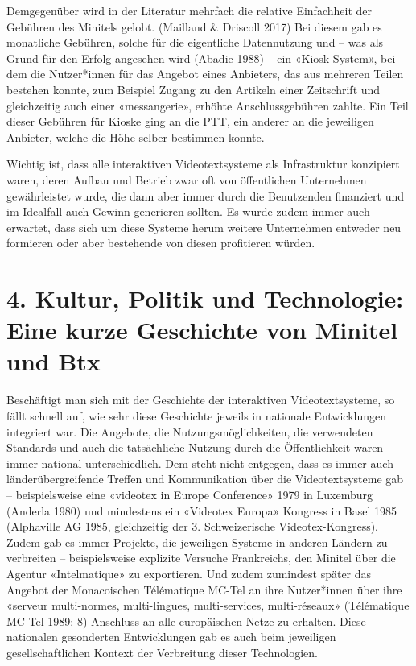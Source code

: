 \documentclass[a4paper,
fontsize=11pt,
oneside,
numbers=noperiodatend,
parskip=half-,
bibliography=totoc,
final
]{scrartcl}
\begin{document}
Demgegenüber wird in der Literatur mehrfach die relative Einfachheit der
Gebühren des Minitels gelobt. (Mailland \& Driscoll 2017) Bei diesem gab
es monatliche Gebühren, solche für die eigentliche Datennutzung und --
was als Grund für den Erfolg angesehen wird (Abadie 1988) -- ein
«Kiosk-System», bei dem die Nutzer*innen für das Angebot eines
Anbieters, das aus mehreren Teilen bestehen konnte, zum Beispiel Zugang
zu den Artikeln einer Zeitschrift und gleichzeitig auch einer
«messangerie», erhöhte Anschlussgebühren zahlte. Ein Teil dieser
Gebühren für Kioske ging an die PTT, ein anderer an die jeweiligen
Anbieter, welche die Höhe selber bestimmen konnte.

Wichtig ist, dass alle interaktiven Videotextsysteme als Infrastruktur
konzipiert waren, deren Aufbau und Betrieb zwar oft von öffentlichen
Unternehmen gewährleistet wurde, die dann aber immer durch die
Benutzenden finanziert und im Idealfall auch Gewinn generieren sollten.
Es wurde zudem immer auch erwartet, dass sich um diese Systeme herum
weitere Unternehmen entweder neu formieren oder aber bestehende von
diesen profitieren würden.

\hypertarget{kultur-politik-und-technologie-eine-kurze-geschichte-von-minitel-und-btx}{%
\section{4. Kultur, Politik und Technologie: Eine kurze Geschichte
von Minitel und
Btx}\label{kultur-politik-und-technologie-eine-kurze-geschichte-von-minitel-und-btx}}

Beschäftigt man sich mit der Geschichte der interaktiven
Videotextsysteme, so fällt schnell auf, wie sehr diese Geschichte
jeweils in nationale Entwicklungen integriert war. Die Angebote, die
Nutzungsmöglichkeiten, die verwendeten Standards und auch die
tatsächliche Nutzung durch die Öffentlichkeit waren immer national
unterschiedlich. Dem steht nicht entgegen, dass es immer auch
länderübergreifende Treffen und Kommunikation über die Videotextsysteme
gab -- beispielsweise eine «videotex in Europe Conference» 1979 in
Luxemburg (Anderla 1980) und mindestens ein «Videotex Europa» Kongress
in Basel 1985 (Alphaville AG 1985, gleichzeitig der 3. Schweizerische
Videotex-Kongress). Zudem gab es immer Projekte, die jeweiligen Systeme
in anderen Ländern zu verbreiten -- beispielsweise explizite Versuche
Frankreichs, den Minitel über die Agentur «Intelmatique» zu exportieren.
Und zudem zumindest später das Angebot der Monacoischen Télématique MC-Tel an ihre Nutzer*innen über ihre «serveur multi-normes, multi-lingues, multi-services, multi-réseaux» (Télématique MC-Tel 1989: 8) Anschluss an alle europäischen Netze zu erhalten. Diese nationalen gesonderten Entwicklungen gab es auch beim jeweiligen gesellschaftlichen Kontext der Verbreitung dieser Technologien.
\end{document}
